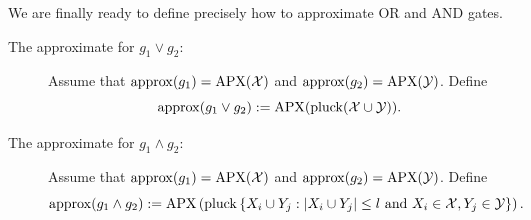 We are finally ready to define precisely how to approximate OR and AND gates.
\begin{definition}

\begin{description}
\item[The approximate for $g_1\lor g_2$:] Assume that ${\rm approx}(g_1)=\mathrm{APX}(\mathcal{X})$ and ${\rm approx}(g_2)=\operatorname{\mathrm{APX}}(\mathcal{Y})$. Define 
$${\rm approx}(g_1\lor g_2):=\mathrm{APX}(\operatorname{pluck}(\mathcal{X} \cup \mathcal{Y})).$$

\item[The approximate  for $g_1\land g_2$:]
Assume that ${\rm approx}(g_1)=\mathrm{APX}(\mathcal{X})$ and ${\rm approx}(g_2)=\operatorname{\mathrm{APX}}(\mathcal{Y})$. Define 
$${\rm approx}(g_1\land g_2):=
    \mathrm{APX}
        \left(
            \operatorname{pluck}
                \left\{
                    X_i \cup Y_j:
                        \left|
                            X_i \cup Y_j
                        \right| 
                        \leq l \text{ and } 
                        X_i \in \mathcal{X}, Y_j \in \mathcal{Y}
                \right\}
       \right).
$$
\end{description}
\end{definition}


% 
% 
% 
% 
% 
% 
% 



